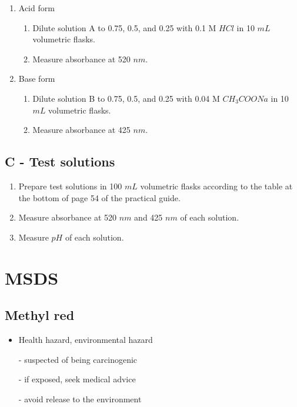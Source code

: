 \documentclass[a4paper, british]{article}
\begin{document}
\begin{appendices}
\begin{enumerate}
    \item Acid form
    \begin{enumerate}
        \item Dilute solution A to 0.75, 0.5, and 0.25 with 0.1 M \(HCl\) in 10 \(mL\) volumetric flasks.
        \item Measure absorbance at 520 \(nm\).
    \end{enumerate}
    \item Base form
    \begin{enumerate}
        \item Dilute solution B to 0.75, 0.5, and 0.25 with 0.04 M \(CH_3 COONa\) in 10 \(mL\) volumetric flasks.
        \item Measure absorbance at 425 \(nm\).
    \end{enumerate}
\end{enumerate}

\subsection*{C - Test solutions}

\begin{enumerate}
    \item Prepare test solutions in 100 \(mL\) volumetric flasks according to the table at the bottom of page 54 of the practical guide.
    \item Measure absorbance at 520 \(nm\) and 425 \(nm\) of each solution.
    \item Measure \(pH\) of each solution.
\end{enumerate}

\newpage

\section{MSDS}

\subsection*{Methyl red}

\begin{itemize}
    \item Health hazard, environmental hazard
    \item[-] suspected of being carcinogenic
    \item[-] if exposed, seek medical advice
    \item[-] avoid release to the environment
\end{itemize}


\end{appendices}
\end{document}
